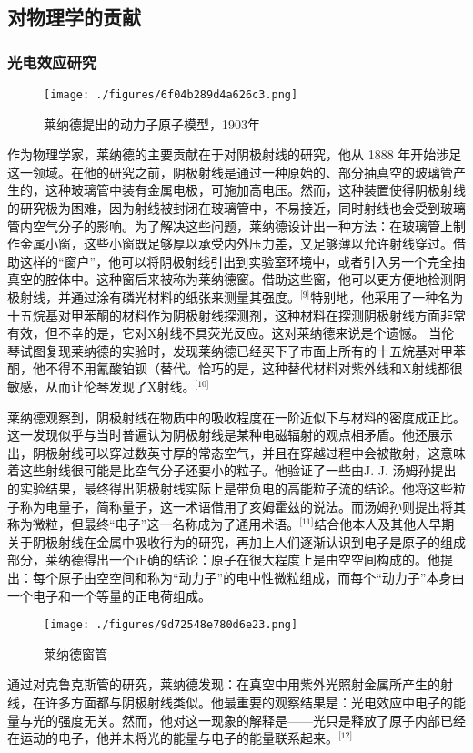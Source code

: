 \subsection{对物理学的贡献}
\subsubsection{光电效应研究}
\begin{figure}[ht]
\centering
\texttt{[image: ./figures/6f04b289d4a626c3.png]}
\caption{莱纳德提出的动力子原子模型，1903年} \label{fig_FLPL_1}
\end{figure}
作为物理学家，莱纳德的主要贡献在于对阴极射线的研究，他从 1888 年开始涉足这一领域。在他的研究之前，阴极射线是通过一种原始的、部分抽真空的玻璃管产生的，这种玻璃管中装有金属电极，可施加高电压。然而，这种装置使得阴极射线的研究极为困难，因为射线被封闭在玻璃管中，不易接近，同时射线也会受到玻璃管内空气分子的影响。为了解决这些问题，莱纳德设计出一种方法：在玻璃管上制作金属小窗，这些小窗既足够厚以承受内外压力差，又足够薄以允许射线穿过。借助这样的“窗户”，他可以将阴极射线引出到实验室环境中，或者引入另一个完全抽真空的腔体中。这种窗后来被称为莱纳德窗。借助这些窗，他可以更方便地检测阴极射线，并通过涂有磷光材料的纸张来测量其强度。\(^\text{[9]}\)特别地，他采用了一种名为十五烷基对甲苯酮的材料作为阴极射线探测剂，这种材料在探测阴极射线方面非常有效，但不幸的是，它对X射线不具荧光反应。这对莱纳德来说是个遗憾。
当伦琴试图复现莱纳德的实验时，发现莱纳德已经买下了市面上所有的十五烷基对甲苯酮，他不得不用氰酸铂钡（替代。恰巧的是，这种替代材料对紫外线和X射线都很敏感，从而让伦琴发现了X射线。\(^\text{[10]}\)

莱纳德观察到，阴极射线在物质中的吸收程度在一阶近似下与材料的密度成正比。这一发现似乎与当时普遍认为阴极射线是某种电磁辐射的观点相矛盾。他还展示出，阴极射线可以穿过数英寸厚的常态空气，并且在穿越过程中会被散射，这意味着这些射线很可能是比空气分子还要小的粒子。他验证了一些由J. J. 汤姆孙提出的实验结果，最终得出阴极射线实际上是带负电的高能粒子流的结论。他将这些粒子称为电量子，简称量子，这一术语借用了亥姆霍兹的说法。而汤姆孙则提出将其称为微粒，但最终“电子”这一名称成为了通用术语。\(^\text{[11]}\)结合他本人及其他人早期关于阴极射线在金属中吸收行为的研究，再加上人们逐渐认识到电子是原子的组成部分，莱纳德得出一个正确的结论：原子在很大程度上是由空空间构成的。他提出：每个原子由空空间和称为“动力子”的电中性微粒组成，而每个“动力子”本身由一个电子和一个等量的正电荷组成。
\begin{figure}[ht]
\centering
\texttt{[image: ./figures/9d72548e780d6e23.png]}
\caption{莱纳德窗管} \label{fig_FLPL_2}
\end{figure}
通过对克鲁克斯管的研究，莱纳德发现：在真空中用紫外光照射金属所产生的射线，在许多方面都与阴极射线类似。他最重要的观察结果是：光电效应中电子的能量与光的强度无关。然而，他对这一现象的解释是——光只是释放了原子内部已经在运动的电子，他并未将光的能量与电子的能量联系起来。\(^\text{[12]}\)

